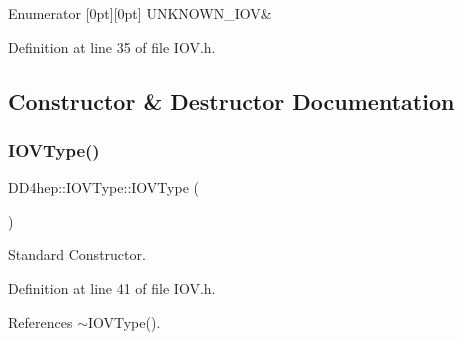 \begin{DoxyEnumFields}{Enumerator}
[0pt][0pt]{}\hypertarget{class_d_d4hep_1_1_i_o_v_type_acef1483c5ce503d44367cf75875c5797aa035632674476d28a4b2a6445303c220}{}\label{class_d_d4hep_1_1_i_o_v_type_acef1483c5ce503d44367cf75875c5797aa035632674476d28a4b2a6445303c220} 
U\+N\+K\+N\+O\+W\+N\+\_\+\+I\+OV&\\
\hline

\end{DoxyEnumFields}


Definition at line 35 of file I\+O\+V.\+h.



\subsection{Constructor \& Destructor Documentation}
\hypertarget{class_d_d4hep_1_1_i_o_v_type_aa45116fda61d8214bcf0f83dcac1e9f6}{}\label{class_d_d4hep_1_1_i_o_v_type_aa45116fda61d8214bcf0f83dcac1e9f6} 
\subsubsection{\texorpdfstring{I\+O\+V\+Type()}{IOVType()}\hspace{0.1cm}{\footnotesize\ttfamily [1/2]}}
{\footnotesize\ttfamily D\+D4hep\+::\+I\+O\+V\+Type\+::\+I\+O\+V\+Type (\begin{DoxyParamCaption}{ }\end{DoxyParamCaption})\hspace{0.3cm}{\ttfamily [inline]}}



Standard Constructor. 



Definition at line 41 of file I\+O\+V.\+h.



References $\sim$\+I\+O\+V\+Type().

\hypertarget{class_d_d4hep_1_1_i_o_v_type_a4768c73cc2f4781beb2d2e57dd2c1b84}{}\label{class_d_d4hep_1_1_i_o_v_type_a4768c73cc2f4781beb2d2e57dd2c1b84} 
